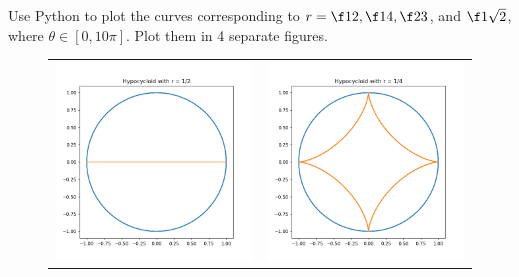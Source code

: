 \documentclass[a4paper]{article}
\begin{document}
\subsection{~} %

\begin{questionbody}
Use Python to plot the curves corresponding to $r = \f12, \f14, \f23$, and $\f1{\sqrt2}$, where $\theta \in [0, 10\pi]$. Plot them in 4 separate figures.
\end{questionbody}

\begin{figure}[hbtp]
    \centering
    \begin{tabular}{cc}
        \includegraphics[scale=0.4]{Q3a-1} & \includegraphics[scale=0.4]{Q3a-2}\\

\end{tabular}
\end{figure}
\end{document}
